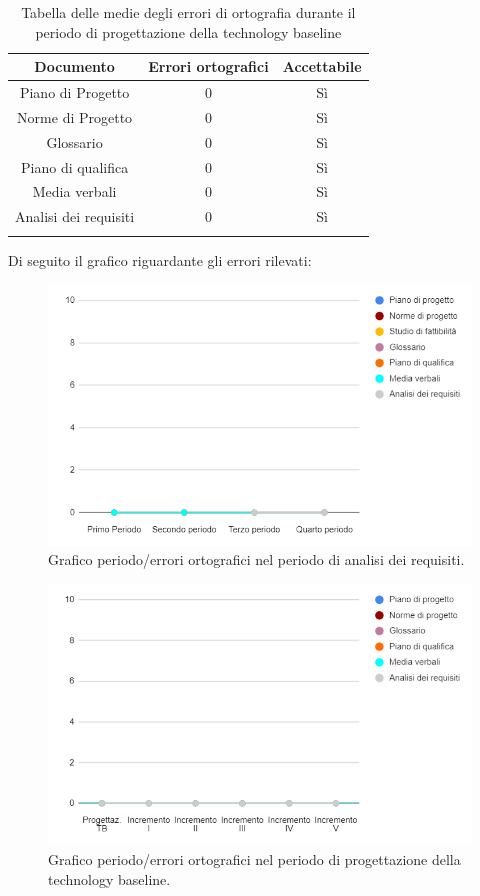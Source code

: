 \begin{center}
	\begin{longtable}{|c|c|c|}
	\hline
	\rowcolor{lighter-grayer}
	\textbf{Documento} & \textbf{Errori ortografici} & \textbf{Accettabile} \\
	\hline
	\endfirsthead

	\hline
	Piano di Progetto & 0 & Sì \\
	\hline
	\hline
	Norme di Progetto &  0 & Sì \\
	\hline
	\hline
	Glossario & 0 & Sì \\
	\hline
	\hline
	Piano di qualifica & 0 & Sì \\
	\hline
	\hline
	Media verbali & 0 & Sì \\
	\hline
	\hline
	Analisi dei requisiti & 0 & Sì \\
	\hline
	\caption{Tabella delle medie degli errori di ortografia durante il periodo di progettazione della technology baseline}
	\end{longtable}
\end{center}

Di seguito il grafico riguardante gli errori rilevati:

\begin{figure}[H]
	\centering
	\includegraphics[width=0.8\linewidth]{./res/images/ortografia_1.png}
	\caption{Grafico periodo/errori ortografici nel periodo di analisi dei requisiti.}
	\label{fig:Grafico errori ortografici durante il periodo di analisi dei requisiti.}
\end{figure}

\begin{figure}[H]
	\centering
	\includegraphics[width=0.8\linewidth]{./res/images/ortografia_2.png}
	\caption{Grafico periodo/errori ortografici nel periodo di progettazione della technology baseline.}
	\label{fig:Grafico errori ortografici durante il periodo di progettazione della technology baseline.}
\end{figure}
